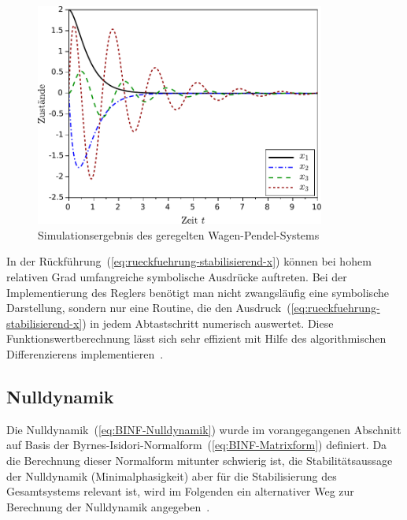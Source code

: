 \begin{figure}
\begin{centering}
\includegraphics[width=0.85\textwidth]{Wagen-Pendel-Simulation}
\par\end{centering}
\caption{Simulationsergebnis des geregelten Wagen-Pendel-Systems\label{fig:Simulation-Wagen-Pendel-System}}
\end{figure}

\begin{remark}
\label{rem:regler-mit-AD}In der Rückführung~(\ref{eq:rueckfuehrung-stabilisierend-x})
können bei hohem relativen Grad umfangreiche symbolische Ausdrücke
auftreten. Bei der Implementierung des Reglers benötigt man nicht
zwangsläufig eine symbolische Darstellung, sondern nur eine Routine,
die den Ausdruck~(\ref{eq:rueckfuehrung-stabilisierend-x}) in jedem
Abtastschritt numerisch auswertet. Diese Funktionswertberechnung lässt
sich sehr effizient mit Hilfe des algorithmischen Differenzierens
implementieren~\cite{roebenack2000at,roebenack2005fgcs,roebenack2007mcmds}.
\end{remark}

\subsection{Nulldynamik}

Die Nulldynamik~(\ref{eq:BINF-Nulldynamik})
wurde im vorangegangenen Abschnitt auf Basis der Byrnes-Isidori-Normalform~(\ref{eq:BINF-Matrixform})
definiert. Da die Berechnung dieser Normalform mitunter schwierig
ist, die Stabilitätsaussage der Nulldynamik (Minimalphasigkeit) aber
für die Stabilisierung des Gesamtsystems relevant ist, wird im Folgenden
ein alternativer Weg zur Berechnung der Nulldynamik angegeben~\cite[{Abschnitt~4.3}]{isidori3}. 


